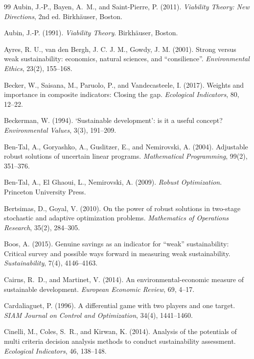 \begin{thebibliography}{99}
 Aubin, J.-P., Bayen, A.~M., and Saint-Pierre, P. (2011). \emph{Viability Theory: New Directions}, 2nd ed. Birkh\"auser, Boston.

 Aubin, J.-P. (1991). \emph{Viability Theory}. Birkh\"auser, Boston.

 Ayres, R. U., van den Bergh, J. C. J. M., Gowdy, J. M. (2001). Strong versus weak sustainability: economics, natural sciences, and ``consilience''. \emph{Environmental Ethics}, 23(2), 155--168.

 Becker, W., Saisana, M., Paruolo, P., and Vandecasteele, I. (2017). Weights and importance in composite indicators: Closing the gap. \emph{Ecological Indicators}, 80, 12--22.

 Beckerman, W. (1994). `Sustainable development': is it a useful concept? \emph{Environmental Values}, 3(3), 191--209.

 Ben-Tal, A., Goryashko, A., Guslitzer, E., and Nemirovski, A. (2004). Adjustable robust solutions of uncertain linear programs. \emph{Mathematical Programming}, 99(2), 351--376.

 Ben-Tal, A., El Ghaoui, L., Nemirovski, A. (2009). \emph{Robust Optimization}. Princeton University Press.

 Bertsimas, D., Goyal, V. (2010). On the power of robust solutions in two-stage stochastic and adaptive optimization problems. \emph{Mathematics of Operations Research}, 35(2), 284--305.

 Boos, A. (2015). Genuine savings as an indicator for ``weak'' sustainability: Critical survey and possible ways forward in measuring weak sustainability. \emph{Sustainability}, 7(4), 4146--4163.

 Cairns, R.~D., and Martinet, V. (2014). An environmental-economic measure of sustainable development. \emph{European Economic Review}, 69, 4--17.

 Cardaliaguet, P. (1996). A differential game with two players and one target. \emph{SIAM Journal on Control and Optimization}, 34(4), 1441--1460.

 Cinelli, M., Coles, S.~R., and Kirwan, K. (2014). Analysis of the potentials of multi criteria decision analysis methods to conduct sustainability assessment. \emph{Ecological Indicators}, 46, 138--148.


\end{thebibliography}
